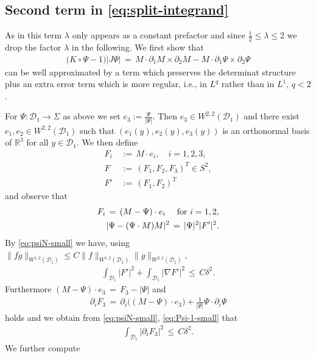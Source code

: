 \documentclass[reqno,makeidx,12pt]{amsart}
\theoremstyle{note}
\theoremstyle{definition}
\begin{document}
\subsection{Second term in \eqref{eq:split-integrand}}
As in this term $\lambda$ only appears as a constant prefactor and since $\frac{1}{2}\leq \lambda\leq 2$ we drop the factor $\lambda$ in the following.
We first show that
\begin{gather*}
	\big(K\circ\Psi -1\big) |J\Psi| \,=\, M\cdot\partial_1 M \times \partial_2 M - M\cdot \partial_1\Psi\times\partial_2\Psi
\end{gather*}
can be well approximated by a term which preserves the determinat structure plus an extra error term which is more regular, i.e., in $L^q$ rather than in $L^1$, $q<2$.

For $\Psi:{\mathcal{D}}_1\to \Sigma$ as above we set $e_3:=\frac{\Psi}{|\Psi|}$. Then $e_3\in W^{2,2}({\mathcal{D}}_1)$ and there exist $e_1,e_2\in W^{2,2}({\mathcal{D}}_1)$ such that $(e_1(y),e_2(y),e_3(y))$ is an orthonormal basis of ${\mathbb R}^3$ for all $y\in {\mathcal{D}}_1$. We then define
\begin{align*}
	F_i\,&:=\, M\cdot e_i,\quad i=1,2,3,\\ F\,&:=\, (F_1,F_2,F_3)^T\in S^2,\\
	F'\,&:=\, (F_1,F_2)^T
\end{align*}
and observe that
\begin{align}
	F_i\,=\, (M-\Psi)\cdot e_i\quad\text{ for }i=1,2, \notag\\
	|\Psi - (\Psi\cdot M)M|^2\,=\, |\Psi|^2|F'|^2. \label{eq:Psi-tan}
\end{align}
By \eqref{eq:psiN-small} we have, using $\|fg\|_{W^{1,2}({\mathcal{D}}_1)}\leq C\|f\|_{W^{1,2}({\mathcal{D}}_1)}\|g\|_{W^{2,2}({\mathcal{D}}_1)}$,
\begin{gather}
	\int_{{\mathcal{D}}_1} |F'|^2 + \int_{{\mathcal{D}}_1} |\nabla F'|^2\,\leq\, C\delta^2. \label{eq:F-small}
\end{gather}
Furthermore $(M-\Psi)\cdot e_3\,=\, F_3 -|\Psi|$ and 
\begin{align}
	\partial_i F_3 \,=\, \partial_i \big((M-\Psi)\cdot e_3\big) +\frac{1}{|\Psi|}\Psi\cdot\partial_i\Psi
\end{align}
holds and we obtain from \eqref{eq:psiN-small}, \eqref{eq:Psi-1-small} that
\begin{gather}
	\int_{{\mathcal{D}}_1} |\partial_i F_3|^2 \,\leq\, C\delta^2. \label{eq:F3-small}
\end{gather}
We further compute
\end{document}
